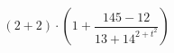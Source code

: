 \documentclass[12pt]{article} %
\begin{document}
$$\left({{ 2 } + { 2 }}\right) \cdot \left({{ 1 } + {\frac{{ 145 } - { 12 }}{{ 13 } + {{ 14 }^{{ 2 } + {{ t }^{ 2 }}}}}}}\right)$$
\end{document}
